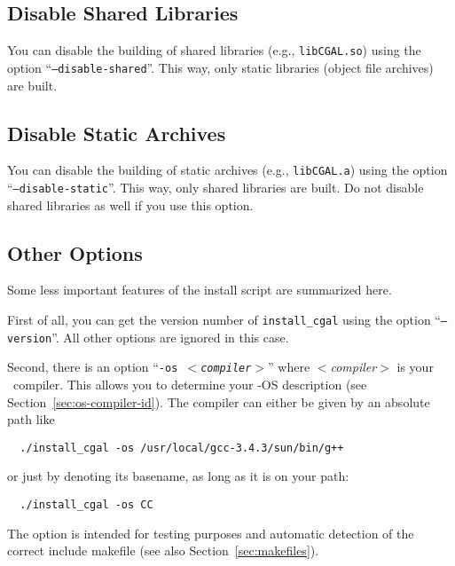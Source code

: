 \subsection{Disable Shared Libraries\label{sec:disable-shared-setup}}

You can disable the building of shared libraries (e.g.,
\texttt{libCGAL.so}) using the option
\mbox{``\texttt{--disable-shared}''}. This
way, only static libraries (object file archives) are built.

\subsection{Disable Static Archives\label{sec:disable-static-setup}}

You can disable the building of static archives (e.g.,
\texttt{libCGAL.a}) using the option
\mbox{``\texttt{--disable-static}''}. This
way, only shared libraries are built. Do not disable shared libraries as
well if you use this option.

\subsection{Other Options\label{sec:other-options}}

Some less important features of the install script are summarized
here.

First of all, you can get the version number of \texttt{install\_cgal}
using the option ``\texttt{--version}''. All other options are ignored
in this case.

Second, there is an option ``\texttt{-os \textit{$<$compiler$>$}}''
where \textit{$<$compiler$>$} is your \CC\ compiler. This allows you
to determine your \cgal-OS description (see
Section~\ref{sec:os-compiler-id}). The compiler can either be given by
an absolute path like
\begin{verbatim}
  ./install_cgal -os /usr/local/gcc-3.4.3/sun/bin/g++
\end{verbatim}
or just by denoting its basename, as long as it is on your path:
\begin{verbatim}
  ./install_cgal -os CC
\end{verbatim}
The option is intended for testing purposes and automatic detection of
the correct include makefile (see also Section~\ref{sec:makefiles}).

